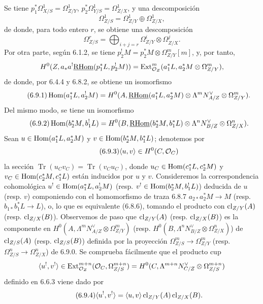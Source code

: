 Se tiene $p_1^*\Omega^1_{X/S}=\Omega^1_{Z/Y}$, $p_2^*\Omega^1_{Y/S}=\Omega^1_{Z/X}$, y una descomposición
\[
\Omega^1_{Z/S}=\Omega^1_{Z/Y}\oplus\Omega^1_{Z/X},
\]
de donde, para todo entero $r$, se obtiene una descomposición
\begin{equation}
\tag{6.9.0}
\Omega^r_{Z/S}=\bigoplus_{i+j=r}\Omega^i_{Z/Y}\otimes\Omega^j_{Z/X}.
\end{equation}
Por otra parte, según 6.1.2, se tiene $p_2^!M=p_2^*M\otimes\Omega^m_{Z/Y}[m]$, y, por tanto,
\[
H^0(Z,a_*a^!\underline{\mathrm{RHom}}(p_1^*L,p_2^!M))=\operatorname{Ext}^m_{\mathcal{O}_Z}(a_1^*L,a_2^*M\otimes\Omega^m_{Z/Y}),
\]
de donde, por 6.4.4 y 6.8.2, se obtiene un isomorfismo
\begin{equation}
\tag{6.9.1}
\operatorname{Hom}(a_1^*L,a_2^!M)=H^0(A,\underline{\mathrm{RHom}}(a_1^*L,a_2^*M)\otimes\Lambda^m N_{A/Z}^{\vee}\otimes\Omega^m_{Z/Y}).
\end{equation}
Del mismo modo, se tiene un isomorfismo
\begin{equation}
\tag{6.9.2}
\operatorname{Hom}(b_2^*M,b_1^!L)=H^0(B,\underline{\mathrm{RHom}}(b_2^*M,b_1^*L)\otimes\Lambda^n N_{B/Z}^{\vee}\otimes\Omega^n_{Z/X}).
\end{equation}
Sean $u\in\operatorname{Hom}(a_1^*L,a_2^*M)$ y $v\in\operatorname{Hom}(b_2^*M,b_1^*L)$; denotemos por
\begin{equation}
\tag{6.9.3}
\langle u,v\rangle\in H^0(C,\mathcal{O}_C)
\end{equation}
la sección $\operatorname{Tr}(u_Cv_C)=\operatorname{Tr}(v_Cu_C)$, donde $u_C\in\operatorname{Hom}(c_1^*L,c_2^*M)$ y $v_C\in\operatorname{Hom}(c_2^*M,c_1^*L)$ están inducidos por $u$ y $v$. Consideremos la correspondencia cohomológica $u^!\in\operatorname{Hom}(a_1^*L,a_2^!M)$ (resp. $v^!\in\operatorname{Hom}(b_2^*M,b_1^!L)$) deducida de $u$ (resp. $v$) componiendo con el homomorfismo de traza 6.8.7 $a_{2*}a_2^*M\to M$ (resp. $b_{1*}b_1^*L\to L$), o, lo que es equivalente (6.8.6), tomando el producto con $\operatorname{cl}_{Z/Y}(A)$ (resp. $\operatorname{cl}_{Z/X}(B)$). Observemos de paso que $\operatorname{cl}_{Z/Y}(A)$ (resp. $\operatorname{cl}_{Z/X}(B)$) es la componente en $H^0(A,\Lambda^mN_{A/Z}^{\vee}\otimes\Omega^m_{Z/Y})$ (resp. $H^0(B,\Lambda^nN_{B/Z}^{\vee}\otimes\Omega^n_{Z/X})$) de $\operatorname{cl}_{Z/S}(A)$ (resp. $\operatorname{cl}_{Z/S}(B)$) definida por la proyección $\Omega^m_{Z/S}\to\Omega^m_{Z/Y}$ (resp. $\Omega^n_{Z/S}\to\Omega^n_{Z/X}$) de 6.9.0. Se comprueba fácilmente que el producto cup
\[
\langle u^!,v^!\rangle\in\operatorname{Ext}^{m+n}_{\mathcal{O}_Z}(\mathcal{O}_C,\Omega^{m+n}_{Z/S})=H^0(C,\Lambda^{m+n}N_{C/Z}^{\vee}\otimes\Omega^{m+n}_{Z/S})
\]
definido en 6.6.3 viene dado por
\begin{equation}
\tag{6.9.4}
\langle u^!,v^!\rangle=\langle u,v\rangle\operatorname{cl}_{Z/Y}(A)\operatorname{cl}_{Z/X}(B).
\end{equation}
